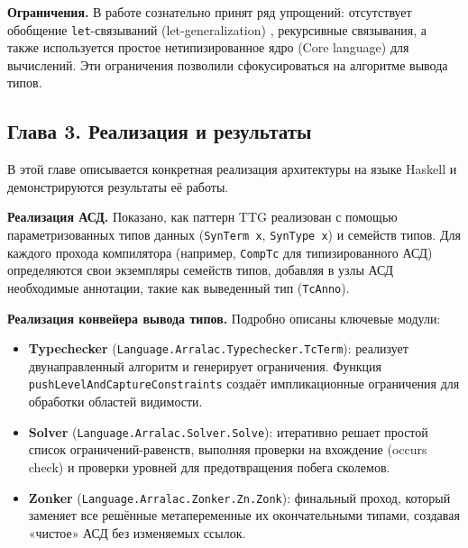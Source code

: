 \textbf{Ограничения.} В работе сознательно принят ряд упрощений: отсутствует обобщение \texttt{let}-связываний (let-generalization) \cite{vytiniotis-outsideinx-2011}, рекурсивные связывания, а также используется простое нетипизированное ядро (Core language) для вычислений. Эти ограничения позволили сфокусироваться на алгоритме вывода типов.

\newpage

\subsection*{Глава 3. Реализация и результаты}

В этой главе описывается конкретная реализация архитектуры на языке Haskell и демонстрируются результаты её работы.

\textbf{Реализация АСД.} Показано, как паттерн TTG реализован с помощью параметризованных типов данных (\texttt{SynTerm x}, \texttt{SynType x}) и семейств типов. Для каждого прохода компилятора (например, \texttt{CompTc} для типизированного АСД) определяются свои экземпляры семейств типов, добавляя в узлы АСД необходимые аннотации, такие как выведенный тип (\texttt{TcAnno}).

\textbf{Реализация конвейера вывода типов.} Подробно описаны ключевые модули:
\begin{itemize}
    \item \textbf{Typechecker} (\texttt{Language.Arralac.Typechecker.TcTerm}): реализует двунаправленный алгоритм и генерирует ограничения. Функция \texttt{pushLevelAndCaptureConstraints} создаёт импликационные ограничения для обработки областей видимости.
    \item \textbf{Solver} (\texttt{Language.Arralac.Solver.Solve}): итеративно решает простой список ограничений-равенств, выполняя проверки на вхождение (occurs check) и проверки уровней для предотвращения побега сколемов.
    \item \textbf{Zonker} (\texttt{Language.Arralac.Zonker.Zn.Zonk}): финальный проход, который заменяет все решённые метапеременные их окончательными типами, создавая «чистое» АСД без изменяемых ссылок.
\end{itemize}

